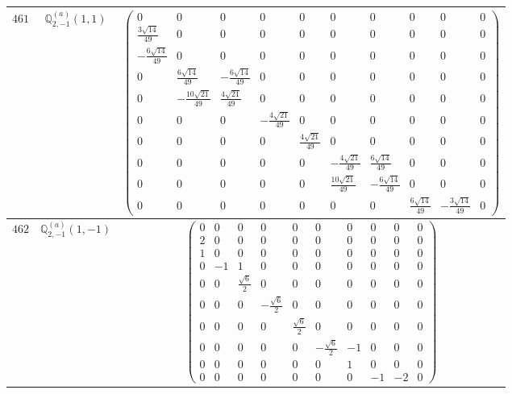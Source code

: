 \documentclass[fleqn,8pt,landscape]{jsarticle}
\begin{document}
\begin{center}
\begin{longtable}{ccc}
$ 461 $ & $ \mathbb{Q}_{2,-1}^{(a)}(1,1) $ & $ \begin{pmatrix} 0 & 0 & 0 & 0 & 0 & 0 & 0 & 0 & 0 & 0 \\ \frac{3 \sqrt{14}}{49} & 0 & 0 & 0 & 0 & 0 & 0 & 0 & 0 & 0 \\ - \frac{6 \sqrt{14}}{49} & 0 & 0 & 0 & 0 & 0 & 0 & 0 & 0 & 0 \\ 0 & \frac{6 \sqrt{14}}{49} & - \frac{6 \sqrt{14}}{49} & 0 & 0 & 0 & 0 & 0 & 0 & 0 \\ 0 & - \frac{10 \sqrt{21}}{49} & \frac{4 \sqrt{21}}{49} & 0 & 0 & 0 & 0 & 0 & 0 & 0 \\ 0 & 0 & 0 & - \frac{4 \sqrt{21}}{49} & 0 & 0 & 0 & 0 & 0 & 0 \\ 0 & 0 & 0 & 0 & \frac{4 \sqrt{21}}{49} & 0 & 0 & 0 & 0 & 0 \\ 0 & 0 & 0 & 0 & 0 & - \frac{4 \sqrt{21}}{49} & \frac{6 \sqrt{14}}{49} & 0 & 0 & 0 \\ 0 & 0 & 0 & 0 & 0 & \frac{10 \sqrt{21}}{49} & - \frac{6 \sqrt{14}}{49} & 0 & 0 & 0 \\ 0 & 0 & 0 & 0 & 0 & 0 & 0 & \frac{6 \sqrt{14}}{49} & - \frac{3 \sqrt{14}}{49} & 0 \end{pmatrix} $ \\ \hline
$ 462 $ & $ \mathbb{Q}_{2,-1}^{(a)}(1,-1) $ & $ \begin{pmatrix} 0 & 0 & 0 & 0 & 0 & 0 & 0 & 0 & 0 & 0 \\ 2 & 0 & 0 & 0 & 0 & 0 & 0 & 0 & 0 & 0 \\ 1 & 0 & 0 & 0 & 0 & 0 & 0 & 0 & 0 & 0 \\ 0 & -1 & 1 & 0 & 0 & 0 & 0 & 0 & 0 & 0 \\ 0 & 0 & \frac{\sqrt{6}}{2} & 0 & 0 & 0 & 0 & 0 & 0 & 0 \\ 0 & 0 & 0 & - \frac{\sqrt{6}}{2} & 0 & 0 & 0 & 0 & 0 & 0 \\ 0 & 0 & 0 & 0 & \frac{\sqrt{6}}{2} & 0 & 0 & 0 & 0 & 0 \\ 0 & 0 & 0 & 0 & 0 & - \frac{\sqrt{6}}{2} & -1 & 0 & 0 & 0 \\ 0 & 0 & 0 & 0 & 0 & 0 & 1 & 0 & 0 & 0 \\ 0 & 0 & 0 & 0 & 0 & 0 & 0 & -1 & -2 & 0 \end{pmatrix} $ \\ \hline

\end{longtable}
\end{center}
\end{document}
